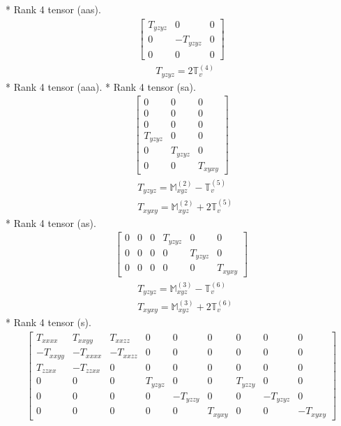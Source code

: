 \documentclass[fleqn,8pt,landscape]{jsarticle}
\begin{document}
* Rank 4 tensor (aas).
\begin{align*}
\begin{bmatrix} T_{yzyz} & 0 & 0 \\ 0 & - T_{yzyz} & 0 \\ 0 & 0 & 0 \end{bmatrix}
\end{align*}
\begin{align*}
& T_{yzyz} = 2 \mathbb{T}_{v}^{(4)}
\end{align*}
* Rank 4 tensor (aaa).
* Rank 4 tensor (sa).
\begin{align*}
\begin{bmatrix} 0 & 0 & 0 \\ 0 & 0 & 0 \\ 0 & 0 & 0 \\ T_{yzyz} & 0 & 0 \\ 0 & T_{yzyz} & 0 \\ 0 & 0 & T_{xyxy} \end{bmatrix}
\end{align*}
\begin{align*}
& T_{yzyz} = \mathbb{M}_{xyz}^{(2)} - \mathbb{T}_{v}^{(5)} \\
& T_{xyxy} = \mathbb{M}_{xyz}^{(2)} + 2 \mathbb{T}_{v}^{(5)}
\end{align*}
* Rank 4 tensor (as).
\begin{align*}
\begin{bmatrix} 0 & 0 & 0 & T_{yzyz} & 0 & 0 \\ 0 & 0 & 0 & 0 & T_{yzyz} & 0 \\ 0 & 0 & 0 & 0 & 0 & T_{xyxy} \end{bmatrix}
\end{align*}
\begin{align*}
& T_{yzyz} = \mathbb{M}_{xyz}^{(3)} - \mathbb{T}_{v}^{(6)} \\
& T_{xyxy} = \mathbb{M}_{xyz}^{(3)} + 2 \mathbb{T}_{v}^{(6)}
\end{align*}
* Rank 4 tensor (s).
\begin{align*}
\begin{bmatrix} T_{xxxx} & T_{xxyy} & T_{xxzz} & 0 & 0 & 0 & 0 & 0 & 0 \\ - T_{xxyy} & - T_{xxxx} & - T_{xxzz} & 0 & 0 & 0 & 0 & 0 & 0 \\ T_{zzxx} & - T_{zzxx} & 0 & 0 & 0 & 0 & 0 & 0 & 0 \\ 0 & 0 & 0 & T_{yzyz} & 0 & 0 & T_{yzzy} & 0 & 0 \\ 0 & 0 & 0 & 0 & - T_{yzzy} & 0 & 0 & - T_{yzyz} & 0 \\ 0 & 0 & 0 & 0 & 0 & T_{xyxy} & 0 & 0 & - T_{xyxy} \end{bmatrix}
\end{align*}
\end{document}
